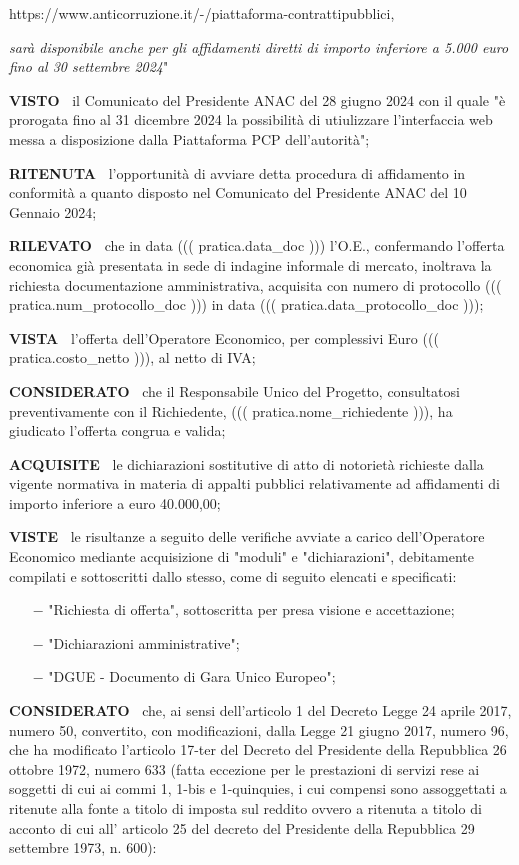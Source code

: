 https://www.anticorruzione.it/-/piattaforma-contrattipubblici,

\textit{sarà disponibile anche per gli affidamenti diretti di importo inferiore
a 5.000 euro fino al 30 settembre 2024}"

\textbf{VISTO~} il Comunicato del Presidente ANAC del 28 giugno 2024
con il quale "è prorogata fino al 31 dicembre 2024 la possibilità di utiulizzare
l'interfaccia web messa a disposizione dalla Piattaforma PCP dell'autorità";

\textbf{RITENUTA~} l'opportunità di avviare detta
procedura di affidamento in conformità a quanto disposto nel Comunicato
del Presidente ANAC del 10 Gennaio 2024;

\textbf{RILEVATO~} che in data ((( pratica.data_doc )))
l'O.E., confermando l'offerta economica
già presentata in sede di indagine informale di mercato, inoltrava
la richiesta documentazione amministrativa, acquisita con numero di protocollo
((( pratica.num_protocollo_doc ))) in data ((( pratica.data_protocollo_doc )));

\textbf{VISTA~} l'offerta dell'Operatore
Economico, per complessivi Euro ((( pratica.costo_netto ))), al netto di IVA;

\textbf{CONSIDERATO~} che il Responsabile Unico del
Progetto, consultatosi preventivamente con il 
 Richiedente, ((( pratica.nome_richiedente ))), ha giudicato l'offerta congrua
 e valida;

\textbf{ACQUISITE~}   le dichiarazioni sostitutive
di atto di notorietà richieste dalla vigente normativa in materia di
appalti pubblici relativamente ad affidamenti di importo inferiore a
euro 40.000,00;

\textbf{VISTE~}	le risultanze a seguito delle verifiche avviate a
carico dell'Operatore Economico mediante acquisizione di "moduli" e
"dichiarazioni", debitamente compilati e sottoscritti dallo stesso, come
di seguito elencati e specificati: 

\begin{itemize}
\item[$-$] "Richiesta di offerta", sottoscritta per presa visione e accettazione;

\item[$-$] "Dichiarazioni amministrative";

\item[$-$] "DGUE - Documento di Gara Unico Europeo"; 
\end{itemize}

\textbf{CONSIDERATO~} che, ai sensi dell'articolo 1 del
Decreto Legge 24 aprile 2017, numero 50, convertito, con modificazioni,
dalla Legge 21 giugno 2017, numero 96, che ha modificato l'articolo
17-ter del Decreto del Presidente della Repubblica 26 ottobre 1972, numero
633 (fatta eccezione per le prestazioni di servizi rese ai soggetti di
cui ai commi 1, 1-bis e 1-quinquies, i cui compensi sono assoggettati a
ritenute alla fonte a titolo di imposta sul reddito ovvero a ritenuta a
titolo di acconto di cui all' articolo 25 del decreto del Presidente della
Repubblica 29 settembre 1973, n. 600):

